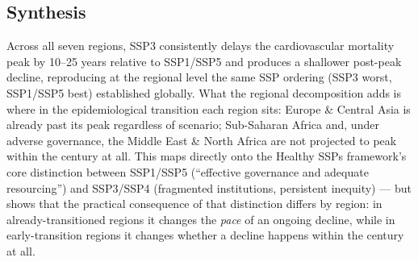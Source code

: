 \subsection*{Synthesis}
Across all seven regions, SSP3 consistently delays the cardiovascular mortality peak by 10--25 years relative to SSP1/SSP5 and produces a shallower post-peak decline, reproducing at the regional level the same SSP ordering (SSP3 worst, SSP1/SSP5 best) established globally. What the regional decomposition adds is where in the epidemiological transition each region sits: Europe \& Central Asia is already past its peak regardless of scenario; Sub-Saharan Africa and, under adverse governance, the Middle East \& North Africa are not projected to peak within the century at all. This maps directly onto the Healthy SSPs framework's core distinction between SSP1/SSP5 (``effective governance and adequate resourcing'') and SSP3/SSP4 (fragmented institutions, persistent inequity) — but shows that the practical consequence of that distinction differs by region: in already-transitioned regions it changes the \emph{pace} of an ongoing decline, while in early-transition regions it changes whether a decline happens within the century at all.
